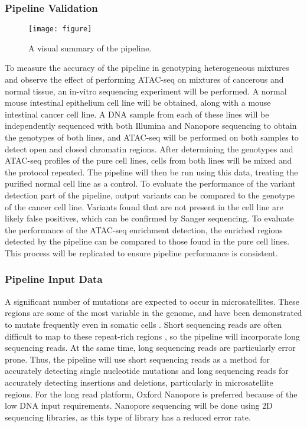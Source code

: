 \subsubsection{Pipeline Validation}

\begin{wrapfigure}{r}{0.66\linewidth}
\centering
\texttt{[image: figure]}
\caption{A visual summary of the pipeline.}
\label{fig:pipeline}
\end{wrapfigure}

To measure the accuracy of the pipeline in genotyping heterogeneous mixtures and observe the effect of performing ATAC-seq on mixtures of cancerous and normal tissue, an in-vitro sequencing experiment will be performed. A normal mouse intestinal epithelium cell line will be obtained, along with a mouse intestinal cancer cell line. A DNA sample from each of these lines will be independently sequenced with both Illumina and Nanopore sequencing to obtain the genotypes of both lines, and ATAC-seq will be performed on both samples to detect open and closed chromatin regions. After determining the genotypes and ATAC-seq profiles of the pure cell lines, cells from both lines will be mixed and the protocol repeated. The pipeline will then be run using this data, treating the purified normal cell line as a control. To evaluate the performance of the variant detection part of the pipeline, output variants can be compared to the genotype of the cancer cell line. Variants found that are not present in the cell line are likely false positives, which can be confirmed by Sanger sequencing. To evaluate the performance of the ATAC-seq enrichment detection, the enriched regions detected by the pipeline can be compared to those found in the pure cell lines.
This process will be replicated to ensure pipeline performance is consistent. 

\subsubsection{Pipeline Input Data} 
A significant number of mutations are expected to occur in microsatellites.
These regions are some of the most variable in the genome, and have been demonstrated to mutate frequently even in somatic cells \parencite{behjati_genome_2014}.
Short sequencing reads are often difficult to map to these repeat-rich regions \parencite{maruvka_analysis_2017}, so the pipeline will incorporate long sequencing reads. At the same time, long sequencing reads are particularly error prone. Thus, the pipeline will use short sequencing reads as a method for accurately detecting single nucleotide mutations and long sequencing reads for accurately detecting insertions and deletions, particularly in microsatellite regions.
For the long read platform, Oxford Nanopore is preferred because of the low DNA input requirements.
Nanopore sequencing will be done using 2D sequencing libraries, as this type of library has a reduced error rate.

